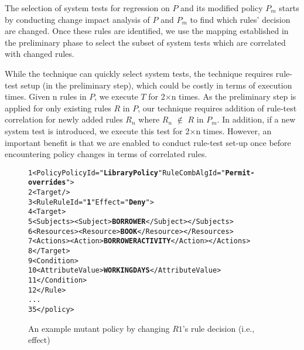 The selection of system tests for regression on $P$ and its modified policy $P_m$ starts by conducting change impact analysis 
of $P$ and $P_m$ to find which rules' decision are changed. 
Once these rules are identified, we use the mapping established in the preliminary phase to select the subset of 
system tests which are correlated with changed rules.

While the technique can quickly select system tests, the technique requires rule-test setup 
(in the preliminary step), which could be costly in terms of execution times. Given n rules in $P$, we execute $T$ for 2$\times$n times. 
As the preliminary step is applied for only existing rules $R$ in $P$, our technique requires addition of rule-test
correlation for newly added rules $R_n$ where $R_n$ $\notin$ $R$ in $P_m$. 
In addition, if a new system test is introduced, we execute this test for 2$\times$n times.
However, an important benefit is that we are enabled to conduct rule-test set-up once before encountering policy 
changes in terms of correlated rules. 

\begin{figure}[t]%
\begin{CodeOut}
\begin{alltt}
 1 <Policy PolicyId="\textbf{Library Policy}" RuleCombAlgId="\textbf{Permit-overrides}">
 2  <Target/>
 3    <Rule RuleId="\textbf{1}" Effect="\textbf{Deny}">
 4      <Target>
 5        <Subjects><Subject> \textbf{BORROWER} </Subject></Subjects>
 6        <Resources><Resource> \textbf{BOOK} </Resource></Resources>
 7        <Actions><Action> \textbf{BORROWERACTIVITY} </Action></Actions>
 8      </Target>
 9	    <Condition>
10        <AttributeValue> \textbf{WORKINGDAYS} </AttributeValue>
11      </Condition>
12    </Rule>
...
35 </policy>
\end{alltt}
\end{CodeOut}
\vspace*{-3.0ex} \caption{An example mutant policy by changing $R1$'s rule decision (i.e., effect)}
 \label{fig:rdcexample}
\end{figure}

